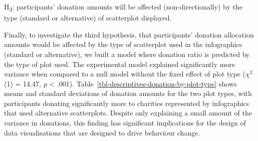 \documentclass[
  authoryear,
  preprint,
  3p]{elsarticle}
\begin{document}
\begin{table}

\caption{\label{tbl-donation-by-r}Means and standard deviations of
donation allocation amounts for each \textit{r} value used.}


\end{table}%


\hspace{0pt}
\begin{tcolorbox}[colback=nicegreen, colframe=gray!50, boxrule=0.5pt]
  H\textsubscript{3}: participants' donation amounts will be affected (non-directionally) by the type (standard or alternative) of scatterplot displayed.
\end{tcolorbox}
\hspace{0pt}

Finally, to investigate the third hypothesis, that participants'
donation allocation amounts would be affected by the type of scatterplot
used in the infographics (standard or alternative), we built a model
where donation ratio is predicted by the type of plot used. The
experimental model explained significantly more variance when compared
to a null model without the fixed effect of plot type (\(\chi^2\)(1) =
14.47, \emph{p} \textless{} .001).
Table~\ref{tbl-descriptives-donation-by-plot-type} shows means and
standard deviations of donation amounts for the two plot types, with
participants donating significantly more to charities represented by
infographics that used alternative scatterplots. Despite only explaining
a small amount of the variance in donations, this finding has
significant implications for the design of data visualisations that are
designed to drive behaviour change.
\end{document}
